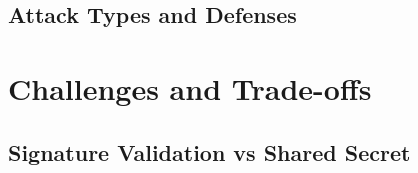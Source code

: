 \documentclass{sig-alternate}
\renewcommand\_{\textunderscore\allowbreak}  %
\begin{document}
\subsection{Attack Types and Defenses}
	
\section{Challenges and Trade-offs}

\subsection{Signature Validation vs Shared Secret}


%
%
%
\end{document}
